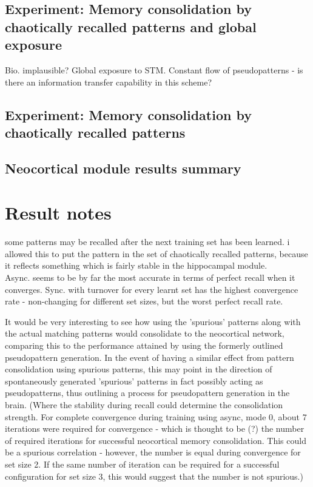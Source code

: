 \subsection{Experiment: Memory consolidation by chaotically recalled patterns and global exposure}

Bio. implausible? Global exposure to STM. Constant flow of pseudopatterns - is there an information transfer capability in this scheme?

\subsection{Experiment: Memory consolidation by chaotically recalled patterns}

\subsection{Neocortical module results summary}


\section*{Result notes}


some patterns may be recalled after the next training set has been learned. i allowed this to put the pattern in the set of chaotically recalled patterns, because it reflects something which is fairly stable in the hippocampal module.
\\

Async. seems to be by far the most accurate in terms of perfect recall when it converges. Sync. with turnover for every learnt set has the highest convergence rate - non-changing for different set sizes, but the worst perfect recall rate.

It would be very interesting to see how using the 'spurious' patterns along with the actual matching patterns would consolidate to the neocortical network, comparing this to the performance attained by using the formerly outlined pseudopattern generation. In the event of having a similar effect from pattern consolidation using spurious patterns, this may point in the direction of spontaneously generated 'spurious' patterns in fact possibly acting as pseudopatterns, thus outlining a process for pseudopattern generation in the brain. (Where the stability during recall could determine the consolidation strength. For complete convergence during training using async, mode 0, about 7 iterations were required for convergence - which is thought to be (?) the number of required iterations for successful neocortical memory consolidation. This could be a spurious correlation - however, the number is equal during convergence for set size 2. If the same number of iteration can be required for a successful configuration for set size 3, this would suggest that the number is not spurious.)
\\

